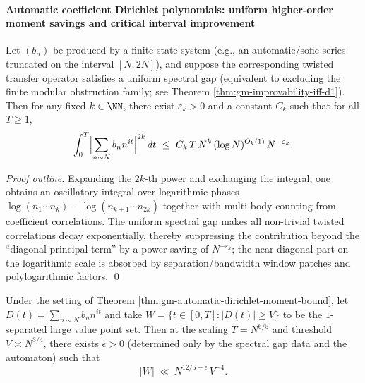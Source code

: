\begin{proposition}
\paragraph{Automatic coefficient Dirichlet polynomials: uniform higher-order moment savings and critical interval improvement}
\begin{theorem}\label{thm:gm-automatic-dirichlet-moment-bound}
Let \((b_n)\) be produced by a finite-state system (e.g., an automatic/sofic series truncated on the interval \([N,2N]\)), and suppose the corresponding twisted transfer operator satisfies a uniform spectral gap (equivalent to excluding the finite modular obstruction family; see Theorem \ref{thm:gm-improvability-iff-d1}).
Then for any fixed \(k\in\NN\), there exist \(\varepsilon_k>0\) and a constant \(C_k\) such that for all \(T\ge 1\),
\[
\int_0^T\Bigl|\sum_{n\sim N} b_n n^{it}\Bigr|^{2k}\,dt
\ \le\
C_k\,T\,N^{k}\,(\log N)^{O_k(1)}\,N^{-\varepsilon_k}.
\]
\end{theorem}

\begin{proof}[Proof outline]
Expanding the \(2k\)-th power and exchanging the integral, one obtains an oscillatory integral over logarithmic phases \(\log(n_1\cdots n_k)-\log(n_{k+1}\cdots n_{2k})\) together with multi-body counting from coefficient correlations.
The uniform spectral gap makes all non-trivial twisted correlations decay exponentially, thereby suppressing the contribution beyond the ``diagonal principal term'' by a power saving of \(N^{-\varepsilon_k}\); the near-diagonal part on the logarithmic scale is absorbed by separation/bandwidth window patches and polylogarithmic factors. \qed
\end{proof}

\begin{corollary}\label{cor:gm-critical-window-automatic-saving}
Under the setting of Theorem \ref{thm:gm-automatic-dirichlet-moment-bound}, let
\(
D(t)=\sum_{n\sim N} b_n n^{it}
\)
and take \(W=\{t\in[0,T]:|D(t)|\ge V\}\) to be the \(1\)-separated large value point set.
Then at the scaling \(T=N^{6/5}\) and threshold \(V\asymp N^{3/4}\), there exists \(\epsilon>0\) (determined only by the spectral gap data and the automaton) such that
\[
|W|\ \ll\ N^{12/5-\epsilon}\,V^{-4}.
\]
\end{corollary}


\end{proposition}
